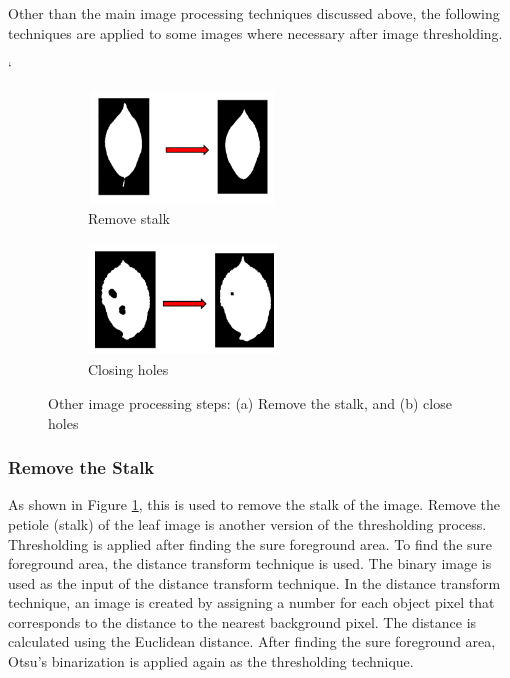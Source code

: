 \documentclass{article}
\begin{document}
Other than the main image processing techniques discussed above,
the following techniques are applied to some images where necessary
after image thresholding.

`

\begin{figure}[!ht]
\begin{subfigure}{.5\textwidth}
\centering
        \includegraphics[width=50mm, height=30mm]{Figures/remove_stalk.png}
        \caption{\label{fig:rst}Remove stalk}
        
\end{subfigure} 
\begin{subfigure}{.5\textwidth}
\centering
        \includegraphics[width=50mm, height=30mm]{Figures/close_holes.png}
        \caption{\label{fig:chl}Closing holes}
        
\end{subfigure} 

\caption{Other image processing steps: (a) Remove the stalk, and (b) close holes}
        \end{figure}

\hypertarget{remove-stalk}{%
\subsubsection{Remove the Stalk}\label{remove-stalk}}

As shown in Figure \ref{fig:rst}, this is used to remove the stalk
of the image. Remove the petiole (stalk) of the leaf image is another
version of the thresholding process. Thresholding is applied after finding
the sure foreground area. To find the sure foreground area, the distance
transform technique is used. The binary image is used as the input of
the distance transform technique. In the distance transform technique, an image is
created by assigning a number for each object pixel that corresponds to
the distance to the nearest background pixel. The distance is calculated
using the Euclidean distance. After finding
the sure foreground area, Otsu's binarization is applied again as the
thresholding technique. 
\end{document}
